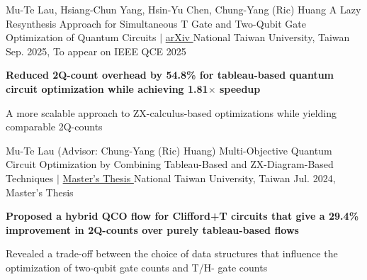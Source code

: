 

\begin{cventries}

    \cventry
        {Mu-Te Lau, Hsiang-Chun Yang, Hsin-Yu Chen, Chung-Yang (Ric) Huang}
        {A Lazy Resynthesis Approach for Simultaneous T Gate and Two-Qubit Gate Optimization of Quantum Circuits
        $|$ 
        \href{https://arxiv.org/abs/2508.04092}{arXiv \faLink}}
        {National Taiwan University, Taiwan}
        {Sep. 2025, To appear on IEEE QCE 2025}
        {
            \begin{cvitems}
               \item \textcolor{awesome}{\textbf{Reduced 2Q-count overhead by 54.8\% for tableau-based quantum circuit optimization while achieving 1.81$\times$ speedup}}
               \item A more scalable approach to ZX-calculus-based optimizations while yielding comparable 2Q-counts
            \end{cvitems}
        }
        
    \cventry
        {Mu-Te Lau (Advisor: Chung-Yang (Ric) Huang)}
        {Multi-Objective Quantum Circuit Optimization by Combining Tableau-Based and ZX-Diagram-Based Techniques
        $|$ 
        \href{https://tdr.lib.ntu.edu.tw/handle/123456789/95208}{Master's Thesis \faLink}}
        {National Taiwan University, Taiwan}
        {Jul. 2024, Master's Thesis}
        {
            \begin{cvitems}
               \item \textcolor{awesome}{\textbf{Proposed a hybrid QCO flow for Clifford+T circuits that give a 29.4\% improvement in 2Q-counts over purely tableau-based flows}}
               \item Revealed a trade-off between the choice of data structures that influence the optimization of two-qubit gate counts and T/H- gate counts
            \end{cvitems}
        }
        

\end{cventries}
